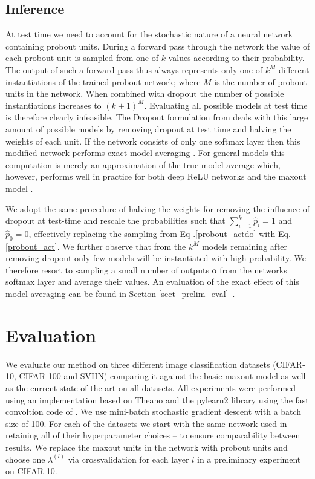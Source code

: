 \documentclass{article} \pdfoutput=1
\begin{document}
\subsection{Inference}
\label{sect_inference}
At test time we need to account for the stochastic nature of a neural
network containing probout units. During a forward pass through the
network the value of each probout unit is sampled from one of $k$
values according to their probability. The output of such a forward
pass thus always represents only one of $k^M$ different instantiations
of the trained probout network; where $M$ is the number of probout
units in the network. When combined with dropout the number of
possible instantiations increases to ${(k+1)}^M$. Evaluating all
possible models at test time is therefore clearly infeasible. The
Dropout formulation from \cite{Hinton2012} deals with this large amount of
possible models by removing dropout at test time and halving the
weights of each unit. If the network consists of only one softmax layer
then this modified network performs exact model averaging
\cite{Hinton2012}.  For general models this computation is merely
an approximation of the true model average which, however, performs
well in practice for both deep ReLU networks \cite{Krizhevsky2012} and
the maxout model \cite{Goodfellow2013}.

We adopt the same procedure of halving the weights for removing the
influence of dropout at test-time and rescale the probabilities such
that $\sum_{i=1}^k \hat{p}_i = 1$ and $\hat{p}_0 = 0$, effectively replacing the
sampling from Eq .\eqref{probout_actdo} with
Eq. \eqref{probout_act}. We further observe that from the $k^M$ models
remaining after removing dropout only few models will be instantiated
with high probability. We therefore resort to sampling a small number
of outputs $\mathbf{o}$ from the networks softmax layer and average
their values. An evaluation of the exact effect of this
model averaging can be found in Section \ref{sect_prelim_eval}~.

\section{Evaluation}
We evaluate our method on three different image classification
datasets (CIFAR-10, CIFAR-100 and SVHN) comparing it against the basic
maxout model as well as the current state of the art on all
datasets. All experiments were performed using an implementation based
on Theano and the pylearn2 library \cite{GoodfellowPylearn} using the
fast convoltion code of \cite{Krizhevsky2012}. We use mini-batch
stochastic gradient descent with a batch size of 100. For each of the
datasets we start with the same network used in
\cite{Goodfellow2013}~-- retaining all of their hyperparameter
choices -- to ensure comparability between results. We replace the
maxout units in the network with probout units and choose one
$\lambda^{(l)}$ via crossvalidation for each layer $l$ in a preliminary
experiment on CIFAR-10.
\end{document}

